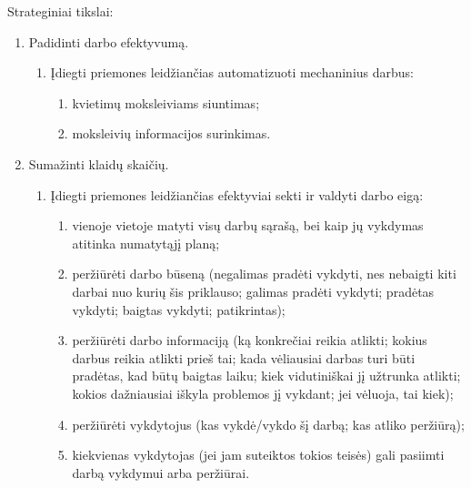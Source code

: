 Strateginiai tikslai:
\begin{enumerate}
  \item \label{tiksl_efek} Padidinti darbo efektyvumą.
    \begin{enumerate}
      \item \label{tiksl_auto} Įdiegti priemones leidžiančias automatizuoti 
        mechaninius darbus:
        \begin{enumerate}
          \item \label{tiksl_el} kvietimų moksleiviams siuntimas;
          \item \label{tiksl_r} moksleivių informacijos surinkimas.
        \end{enumerate}
    \end{enumerate}
  \item \label{tiksl_kl} Sumažinti klaidų skaičių.
    \begin{enumerate}
      \item \label{tiksl_vald} Įdiegti priemones leidžiančias efektyviai 
        sekti ir valdyti darbo eigą:
        \begin{enumerate}
          \item \label{tiksl_dvisk} vienoje vietoje matyti visų darbų 
            sąrašą, bei kaip jų vykdymas atitinka numatytąjį planą;
          \item \label{tiksl_dbus} peržiūrėti darbo būseną (negalimas 
            pradėti vykdyti, nes
            nebaigti kiti darbai nuo kurių šis priklauso; galimas pradėti
            vykdyti; pradėtas vykdyti; baigtas vykdyti; patikrintas);
          \item \label{tiksl_dinfo} peržiūrėti darbo informaciją (ką 
            konkrečiai reikia 
            atlikti; kokius darbus reikia atlikti prieš tai; kada 
            vėliausiai darbas turi būti pradėtas, kad būtų baigtas laiku;
            kiek vidutiniškai jį užtrunka atlikti; kokios dažniausiai 
            iškyla problemos jį vykdant; jei vėluoja, tai kiek);
          \item \label{tiksl_dvyk} peržiūrėti vykdytojus (kas vykdė/vykdo 
            šį darbą; kas atliko peržiūrą);
          \item \label{tiksl_dv} kiekvienas vykdytojas (jei jam suteiktos 
            tokios teisės) gali pasiimti darbą vykdymui arba peržiūrai.
        \end{enumerate}
    \end{enumerate}
\end{enumerate}
